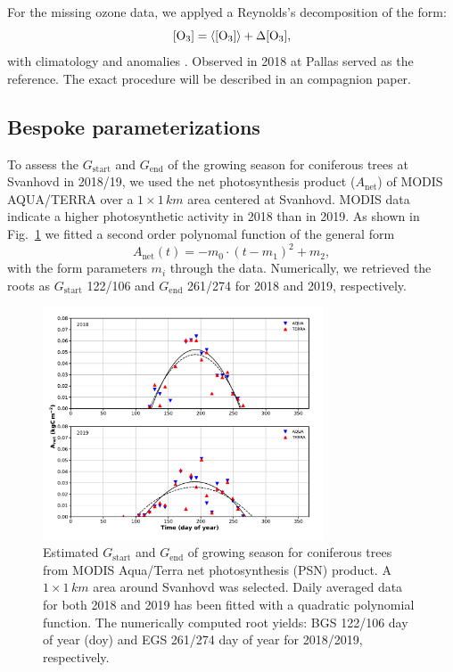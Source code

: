 \documentclass[bg, manuscript]{copernicus}
\begin{document}
For the missing ozone data, we applyed a Reynolds's decomposition of the form:
\begin{equation}
  \chem{[O_3]} = \chem{\left<[O_3]\right>} + \chem{\Delta[O_3]},
  \label{eq:reynolds_decomp}
\end{equation}
with climatology \chem{\left<[O_3]\right>} and anomalies \chem{\Delta[O_3]}. Observed \chem{[O_3]} in 2018 at Pallas served as the reference. The exact procedure will be described in an compagnion paper.

\subsection{Bespoke parameterizations}

To assess the $G_\mathrm{start}$  and $G_\mathrm{end}$ of the growing season for coniferous trees at Svanhovd in 2018/19, we used the net photosynthesis product ($A_\mathrm{net}$) of MODIS AQUA/TERRA over a $1\times 1\,\unit{km}$ area centered at Svanhovd. MODIS data indicate a higher photosynthetic activity in 2018 than in 2019. As shown in Fig.~\ref{fig:modis_Psn} we fitted a second order polynomal function of the general form
%
\begin{equation}
A_\mathrm{net}(t) =  -m_0\cdot(t-m_1)^2+m_2,
\end{equation}
%
with the form parameters $m_i$ through the data. Numerically, we retrieved the roots as $G_\mathrm{start}$ 122/106 and $G_\mathrm{end}$ 261/274 for 2018 and 2019, respectively. 

\begin{figure}[th]
  \includegraphics[width=8.3cm]{figB1}
  \caption{Estimated $G_\mathrm{start}$ and $G_\mathrm{end}$ of growing season for coniferous trees from MODIS Aqua/Terra net photosynthesis (PSN) product. A $1\times 1\,\unit{km}$ area around Svanhovd was selected. Daily averaged data for both 2018 and 2019 has been fitted with a quadratic polynomial function. The numerically computed root yields: BGS 122/106 day of year (\unit{doy}) and EGS 261/274 day of year for 2018/2019, respectively.}
  \label{fig:modis_Psn}
\end{figure}
\end{document}
